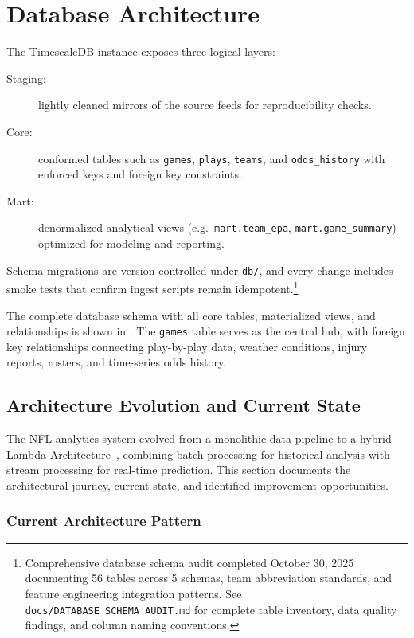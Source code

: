 \section{Database Architecture}\label{sec:schema-mart}
The TimescaleDB instance exposes three logical layers:
\begin{description}
  \item[Staging:] lightly cleaned mirrors of the source feeds for reproducibility checks.
  \item[Core:] conformed tables such as \texttt{games}, \texttt{plays}, \texttt{teams}, and \texttt{odds\_history} with enforced keys and foreign key constraints.
  \item[Mart:] denormalized analytical views (e.g.\ \texttt{mart.team\_epa}, \texttt{mart.game\_summary})\\ optimized for modeling and reporting.
\end{description}
Schema migrations are version-controlled under \texttt{db/}, and every change includes smoke tests that confirm ingest scripts remain idempotent.\footnote{Comprehensive database schema audit completed October 30, 2025 documenting 56 tables across 5 schemas, team abbreviation standards, and feature engineering integration patterns. See \texttt{docs/DATABASE\_SCHEMA\_AUDIT.md} for complete table inventory, data quality findings, and column naming conventions.}

The complete database schema with all core tables, materialized views, and relationships is shown in . The \texttt{games} table serves as the central hub, with foreign key relationships connecting play-by-play data, weather conditions, injury reports, rosters, and time-series odds history.



\subsection{Architecture Evolution and Current State}
\label{subsec:architecture_evolution}

The NFL analytics system evolved from a monolithic data pipeline to a hybrid Lambda Architecture~\cite{marz2015big}, combining batch processing for historical analysis with stream processing for real-time prediction. This section documents the architectural journey, current state, and identified improvement opportunities.

\subsubsection{Current Architecture Pattern}

